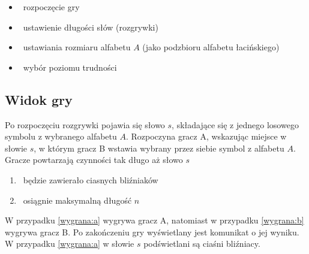 \documentclass[11pt,a4paper]{article}
\begin{document}
\begin{itemize}
	\item\ rozpoczęcie gry
	\item\ ustawienie długości słów (rozgrywki)
	\item\ ustawiania rozmiaru alfabetu $A$ (jako podzbioru alfabetu łacińskiego)
	\item\ wybór poziomu trudności
\end{itemize}

\subsection{Widok gry}
Po rozpoczęciu rozgrywki pojawia się słowo $s$,
składające się z jednego losowego
symbolu z wybranego alfabetu $A$.
Rozpoczyna gracz A, wskazując miejsce w słowie $s$,
w którym gracz B wstawia wybrany przez
siebie symbol z alfabetu $A$.
Gracze powtarzają czynności tak długo aż słowo $s$
\begin{enumerate}
	\item\ będzie zawierało ciasnych bliźniaków \label{wygrana:a}
	\item\ osiągnie maksymalną długość $n$ \label{wygrana:b}
\end{enumerate}

W przypadku \ref{wygrana:a} wygrywa gracz A, natomiast
w przypadku \ref{wygrana:b} wygrywa gracz B.
Po zakończeniu gry wyświetlany jest komunikat o jej wyniku.
W przypadku \ref{wygrana:a} w słowie $s$ podświetlani są
ciaśni bliźniacy.
\end{document}
